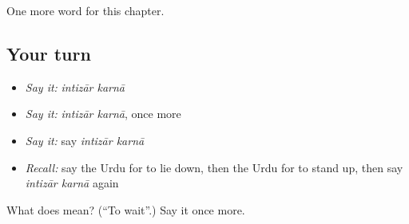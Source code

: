 \begin{grammarlens}[title={What you've built}]
One more word for this chapter.
\end{grammarlens}

\subsection*{Your turn}
\begin{itemize}
\raggedright
  \item \emph{Say it:} \emph{intizār karnā}
  \item \emph{Say it:} \emph{intizār karnā}, once more
  \item \emph{Say it:} say \emph{intizār karnā}
  \item \emph{Recall:} say the Urdu for to lie down, then the Urdu for to stand up, then say \emph{intizār karnā} again
\end{itemize}

\begin{tcolorbox}[breakable,colback=teal!4,colframe=teal!35!black,title={Before you move on}]
What does   mean? (\textquotedblleft{}To wait\textquotedblright{}.) Say it once more.
\end{tcolorbox}
